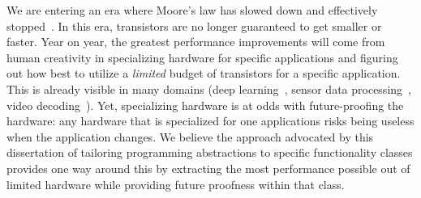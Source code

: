 We are entering an era where Moore's law has slowed down and effectively
stopped~\cite{moores_law_dead}. In this era, transistors are no longer
guaranteed to get smaller or faster. Year on year, the greatest performance
improvements will come from human creativity in specializing hardware for
specific applications and figuring out how best to utilize a \textit{limited}
budget of transistors for a specific application. This is already visible in
many domains (\eg deep learning~\cite{tpu}, sensor data processing~\cite{m7},
video decoding~\cite{qualcomm_video}). Yet, specializing hardware is at odds
with future-proofing the hardware: any hardware that is specialized for one
applications risks being useless when the application changes. We believe the
approach advocated by this dissertation of tailoring programming abstractions
to specific functionality classes provides one way around this by extracting
the most performance possible out of limited hardware while providing future
proofness within that class.
